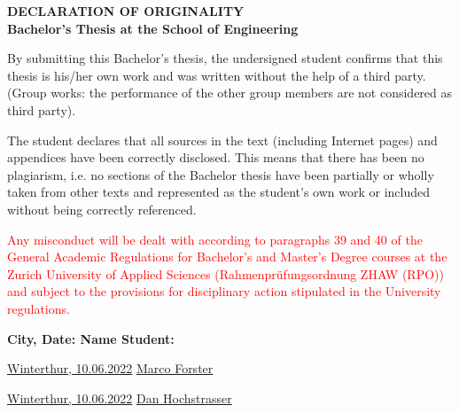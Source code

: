 \topskip 0pt
\vspace*{\fill}

\textbf{DECLARATION OF ORIGINALITY} \\
\textbf{Bachelor’s Thesis at the School of Engineering}

By submitting this Bachelor’s thesis, the undersigned student confirms that this thesis is his/her own work and was written without the help of a third party. (Group works: the performance of the other group members are not considered as third party).

The student declares that all sources in the text (including Internet pages) and appendices have been correctly disclosed. This means that there has been no plagiarism, i.e. no sections of the Bachelor thesis have been partially or wholly taken from other texts and represented as the student’s own work or included without being correctly referenced.

\textcolor{red}{Any misconduct will be dealt with according to paragraphs 39 and 40 of the General Academic Regulations for Bachelor’s and Master’s Degree courses at the Zurich University of Applied Sciences (Rahmenprüfungsordnung ZHAW (RPO)) and subject to the provisions for disciplinary action stipulated in the University regulations.}

\vspace{15mm}

\textbf{City, Date: \hspace{31mm} Name Student:}

\vspace{5mm}

\underline{Winterthur, 10.06.2022} \hspace{14mm} \underline{Marco Forster}

\vspace{5mm}

\underline{Winterthur, 10.06.2022} \hspace{14mm} \underline{Dan Hochstrasser}

\vspace*{\fill}
